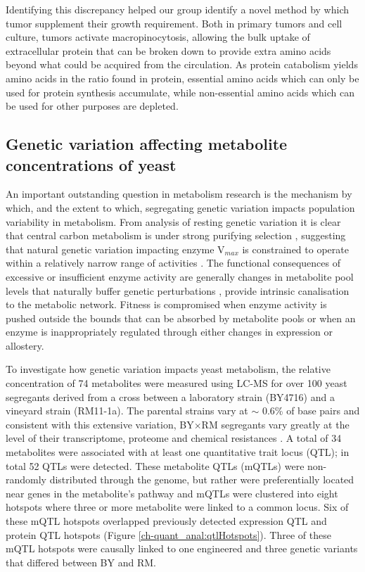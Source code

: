 Identifying this discrepancy helped our group identify a novel method by which tumor supplement their growth requirement.  Both in primary tumors and cell culture, tumors activate macropinocytosis, allowing the bulk uptake of extracellular protein that can be broken down to provide extra amino acids beyond what could be acquired from the circulation. As protein catabolism yields amino acids in the ratio found in protein, essential amino acids which can only be used for protein synthesis accumulate, while non-essential amino acids which can be used for other purposes are depleted.  


\subsection{Genetic variation affecting metabolite concentrations of yeast}

An important outstanding question in metabolism research is the mechanism by which, and the extent to which, segregating genetic variation impacts population variability in metabolism.  From analysis of resting genetic variation it is clear that central carbon metabolism is under strong purifying selection \cite{Greenberg:2008uy}, suggesting that natural genetic variation impacting enzyme V$_{max}$ is constrained to operate within a relatively narrow range of activities \cite{Greenberg:2008uy}. The functional consequences of excessive or insufficient enzyme activity are generally changes in metabolite pool levels that naturally buffer genetic perturbations \cite{Fendt:2010gr}, provide intrinsic canalisation to the metabolic network. Fitness is compromised when enzyme activity is pushed outside the bounds that can be absorbed by metabolite pools or when an enzyme is inappropriately regulated through either changes in expression or allostery. 

To investigate how genetic variation impacts yeast metabolism, the relative concentration of 74 metabolites were measured using LC-MS for over 100 yeast segregants derived from a cross between a laboratory strain (BY4716) and a vineyard strain (RM11-1a). The parental strains vary at $\sim$ 0.6\% of base pairs and consistent with this extensive variation, BY$\times$RM segregants vary greatly at the level of their transcriptome, proteome and chemical resistances \cite{Brem:2005gh, Foss:2007ej, Bloom:2013bq}. A total of 34 metabolites were associated with at least one quantitative trait locus (QTL); in total 52 QTLs were detected.  These metabolite QTLs (mQTLs) were non-randomly distributed through the genome, but rather were preferentially located near genes in the metabolite's pathway and mQTLs were clustered into eight hotspots where three or more metabolite were linked to a common locus. Six of these mQTL hotspots overlapped previously detected expression QTL and protein QTL hotspots (Figure \ref{ch-quant_anal:qtlHotspots}). Three of these mQTL hotspots were causally linked to one engineered and three genetic variants that differed between BY and RM. 

